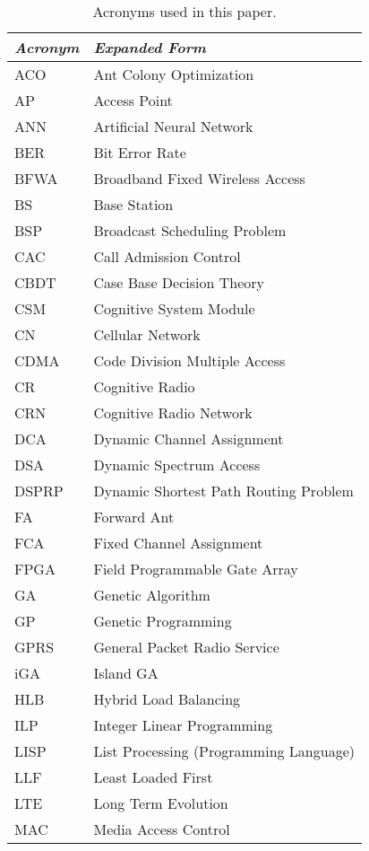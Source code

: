 \documentclass[journal]{IEEEtran}
\begin{document}
\begin{table}
\caption{Acronyms used in this paper.}
\label{tab:acronyms}
\footnotesize
\centering
\begin{tabular}{p{1.3cm}p{5.3cm}}

\toprule
\textbf{\textit{Acronym}} & \textbf{\textit{Expanded Form}}\\
\midrule

ACO  &  Ant Colony Optimization\\
AP  &  Access Point\\
ANN   &   Artificial Neural Network \\
BER  &  Bit Error Rate\\
BFWA  &  Broadband Fixed Wireless Access\\
BS  &  Base Station\\
BSP  &  Broadcast Scheduling Problem\\
CAC  &  Call Admission Control\\
CBDT  &  Case Base Decision Theory\\
CSM  &  Cognitive System Module\\
CN  &  Cellular Network \\
CDMA   &   Code Division Multiple Access\\
CR   &   Cognitive Radio \\
CRN   &   Cognitive Radio Network \\
DCA  &  Dynamic Channel Assignment\\
DSA & Dynamic Spectrum Access\\
DSPRP  &  Dynamic Shortest Path Routing Problem\\
FA  &  Forward Ant\\
FCA  &  Fixed Channel Assignment\\
FPGA  &  Field Programmable Gate Array\\
GA  &  Genetic Algorithm\\
GP  &  Genetic Programming\\
GPRS  &  General Packet Radio Service\\
iGA  &  Island GA\\
HLB  &  Hybrid Load Balancing\\
ILP  &  Integer Linear Programming\\
LISP  &  List Processing (Programming Language)\\
LLF  &  Least Loaded First\\
LTE   &   Long Term Evolution\\
MAC   &   Media Access Control\\

\end{tabular}
\end{table}
\end{document}
